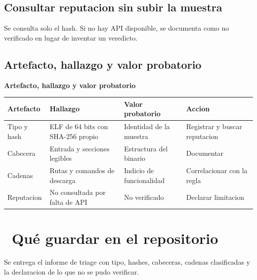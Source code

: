 \documentclass[11pt,a4paper]{article}
\newcommand{\iconotexto}[2]{\textcolor{cyanNeon}{\faIcon{#1}}~#2}
\begin{document}
\subsection{Consultar reputacion sin subir la muestra}

Se consulta solo el hash. Si no hay API disponible, se documenta como no verificado en lugar de inventar un veredicto.

\subsection{Artefacto, hallazgo y valor probatorio}

\begin{center}
\begin{minipage}{\linewidth}
\centering
{\footnotesize
\textbf{Artefacto, hallazgo y valor probatorio}\par\smallskip
\begin{tabular}{@{}>{\raggedright\arraybackslash}p{2.60cm}>{\raggedright\arraybackslash}p{4.40cm}>{\raggedright\arraybackslash}p{2.80cm}>{\raggedright\arraybackslash}p{3.00cm}@{}}
\toprule
\textbf{Artefacto} & \textbf{Hallazgo} & \textbf{Valor probatorio} & \textbf{Accion} \\
\midrule
Tipo y hash & ELF de 64 bits con SHA-256 propio & Identidad de la muestra & Registrar y buscar reputacion \\
Cabecera & Entrada y secciones legibles & Estructura del binario & Documentar \\
Cadenas & Rutas y comandos de descarga & Indicio de funcionalidad & Correlacionar con la regla \\
Reputacion & No consultada por falta de API & No verificado & Declarar limitacion \\
\bottomrule
\end{tabular}
}
\par{}
\end{minipage}
\end{center}

\section{\iconotexto{box-open}{Qué guardar en el repositorio}}

Se entrega el informe de triage con tipo, hashes, cabeceras, cadenas clasificadas y la declaracion de lo que no se pudo verificar.
\end{document}

